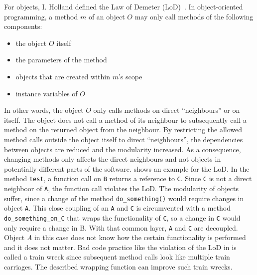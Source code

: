 For objects, I. Holland defined the Law of Demeter (LoD)~\cite{lieberherr_assuring_1989}.
In object-oriented programming, a method $m$ of an object $O$ may only call methods of the following components:
\begin{itemize}
    \item the object $O$ itself
    \item the parameters of the method
    \item objects that are created within $m$'s scope
    \item instance variables of $O$
\end{itemize}
In other words, the object $O$ only calls methods on direct \enquote{neighbours} or on itself. The object does not call a method of its neighbour to subsequently call a method on the returned object from the neighbour. By restricting the allowed method calls outside the object itself to direct \enquote{neighbours}, the dependencies between objects are reduced and the modularity increased. As a consequence, changing methods only affects the direct neighbours and not objects in potentially different parts of the software. 
 shows an example for the LoD. In the method \texttt{test}, a function call on \texttt{B} returns a reference to \texttt{C}. Since \texttt{C} is not a direct neighboor of \texttt{A}, the function call violates the LoD. The modularity of objects suffer, since a change of the method \texttt{do\_something()} would require changes in object \texttt{A}. This close coupling of an \texttt{A} and \texttt{C} is circumvented with a method \texttt{do\_something\_on\_C} that wraps the functionality of \texttt{C}, so a change in \texttt{C} would only require a change in B. With that common layer, \texttt{A} and \texttt{C} are decoupled. Object \textit{A} in this case does not know how the certain functionality is performed and it does not matter.  
Bad code practice like the violation of the LoD in  is called a train wreck since subsequent method calls look like multiple train carriages. The described wrapping function can improve such train wrecks.

